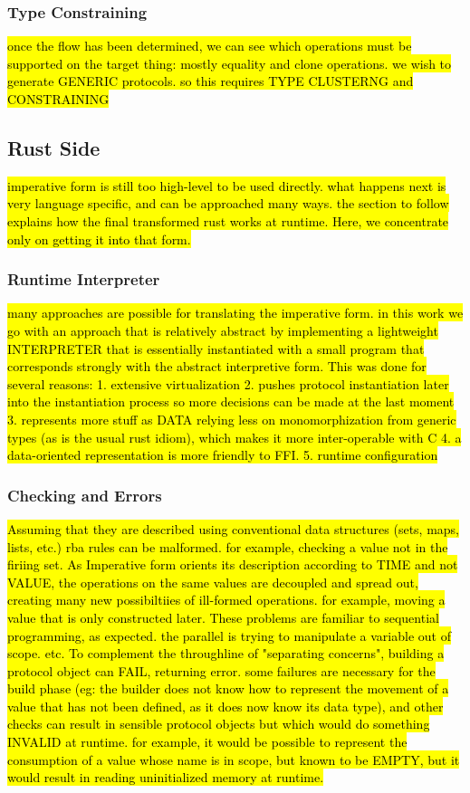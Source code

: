 \subsubsection{Type Constraining}
\hl{once the flow has been determined, we can see which operations must be supported on the target thing: mostly equality and clone operations. we wish to generate GENERIC protocols. so this requires TYPE CLUSTERNG and CONSTRAINING}

\subsection{Rust Side}
\hl{
imperative form is still too high-level to be used directly. what happens next is very language specific, and can be approached many ways. the section to follow explains how the final transformed rust works at runtime. Here, we concentrate only on getting it into that form.
}

\subsubsection{Runtime Interpreter}
\hl{many approaches are possible for translating the imperative form. in this work we go with an approach that is relatively abstract by implementing a lightweight INTERPRETER that is essentially instantiated with a small program that corresponds strongly with the abstract interpretive form. 
	This was done for several reasons: 
	1. extensive virtualization
	2. pushes protocol instantiation later into the instantiation process so more decisions can be made at the last moment
	3. represents more stuff as DATA relying less on monomorphization from generic types (as is the usual rust idiom), which makes it more inter-operable with C
	4. a data-oriented representation is more friendly to FFI. 
	5. runtime configuration}

\subsubsection{Checking and Errors}
\hl{Assuming that they are described using conventional data structures (sets, maps, lists, etc.) rba rules can be malformed. for example, checking a value not in the firiing set. As  Imperative form orients its description according to TIME and not VALUE, the operations on the same values are decoupled and spread out, creating many new possibiltiies of ill-formed operations. for example, moving a value that is only constructed later. These problems are familiar to sequential programming, as expected. the parallel is trying to manipulate a variable out of scope. etc.
To complement the throughline of "separating concerns", building a protocol object can FAIL, returning error. some failures are necessary for the build phase (eg: the builder does not know how to represent the movement of a value that has not been defined, as it does now know its data type), and other checks can result in sensible protocol objects but which would do something INVALID at runtime. for example, it would be possible to represent the consumption of a value whose name is in scope, but known to be EMPTY, but it would result in reading uninitialized memory at runtime.
}



